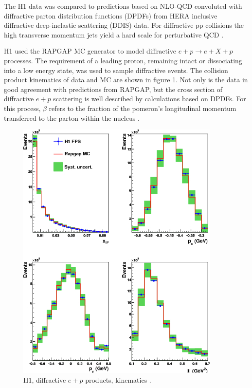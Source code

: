 The H1 data was compared to predictions based on NLO-QCD convoluted with diffractive parton distribution functions (DPDFs) from HERA inclusive diffractive deep-inelastic scattering (DDIS) data. For diffractive pp collisions the high transverse momentum jets yield a hard scale for perturbative QCD \cite{Aaron:2010su}.

H1 used the RAPGAP MC generator to model diffractive $e+p \rightarrow e+X+p$ processes. The requirement of a leading proton, remaining intact or dissociating into a low energy state, was used to sample diffractive events. The collision product kinematics of data and MC are shown in figure \ref{fig:h1Kinematics}. Not only is the data in good agreement with predictions from RAPGAP, but the cross section of diffractive $e+p$ scattering is well described by calculations based on DPDFs. For this process, $\beta$ refers to the fraction of the pomeron's longitudinal momentum transferred to the parton within the nucleus \cite{Aaron:2010aa}. 

\begin{figure}[h!]
\begin{centering}
\includegraphics[width=4in]{Chapter2/importfigs/d10-095f3.png}
\par\end{centering}
\caption{H1, diffractive $e+p$ products, kinematics \cite{Aaron:2010aa}. \label{fig:h1Kinematics}}
\end{figure}

